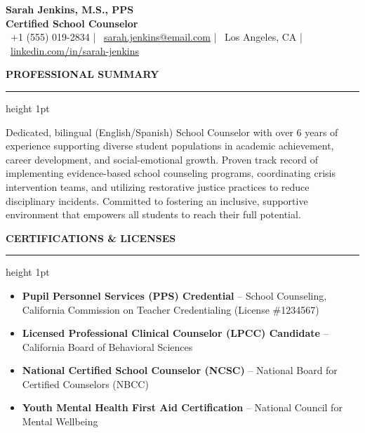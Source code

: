 \documentclass[10pt,letterpaper]{article}
\newcommand{\cvsection}[1]{%
  \vspace{6pt}%
  {\color{primarycolor}\large\bfseries\MakeUppercase{#1}}%
  \vspace{1.5pt}%
  {\color{sectionline}\hrule height 1pt}%
  \vspace{3pt}%
}
\begin{document}
\color{textcolor}
\pagestyle{empty}

\begin{center}
    {\color{primarycolor}\LARGE\bfseries Sarah Jenkins, M.S., PPS} \\
    \vspace{2pt}
    {\large\bfseries Certified School Counselor} \\
    \vspace{3pt}
    {\small
    \faPhone\ +1 (555) 019-2834 \quad | \quad 
    \faEnvelope\ \href{mailto:sarah.jenkins@email.com}{sarah.jenkins@email.com} \quad | \quad 
    \faMapMarker\ Los Angeles, CA \quad | \quad 
    \faLinkedin\ \href{https://linkedin.com/in/fictional-sarah-jenkins}{linkedin.com/in/sarah-jenkins}
    }
\end{center}

\vspace{-2pt}

\cvsection{Professional Summary}
Dedicated, bilingual (English/Spanish) School Counselor with over 6 years of experience supporting diverse student populations in academic achievement, career development, and social-emotional growth. Proven track record of implementing evidence-based school counseling programs, coordinating crisis intervention teams, and utilizing restorative justice practices to reduce disciplinary incidents. Committed to fostering an inclusive, supportive environment that empowers all students to reach their full potential.

\cvsection{Certifications \& Licenses}
\begin{itemize}[leftmargin=1.5em, nosep, label=\raisebox{0.25ex}{\tiny$\bullet$}]
    \item \textbf{Pupil Personnel Services (PPS) Credential} -- School Counseling, California Commission on Teacher Credentialing (License \#1234567)
    \item \textbf{Licensed Professional Clinical Counselor (LPCC) Candidate} -- California Board of Behavioral Sciences
    \item \textbf{National Certified School Counselor (NCSC)} -- National Board for Certified Counselors (NBCC)
    \item \textbf{Youth Mental Health First Aid Certification} -- National Council for Mental Wellbeing
\end{itemize}
\end{document}
